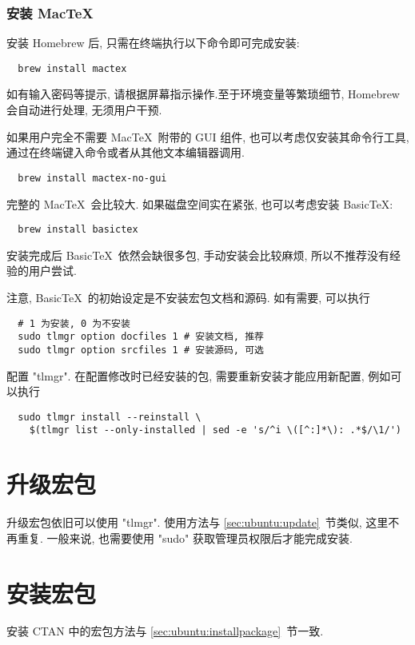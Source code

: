 \subsubsection{安装 Mac\TeX}

安装 Homebrew 后,
只需在\textsf{终端}执行以下命令即可完成安装:
\begin{lstlisting}
  brew install mactex
\end{lstlisting}
如有输入密码等提示, 请根据屏幕指示操作.至于环境变量等繁琐细节, Homebrew 会自动进行处理,
无须用户干预.

如果用户完全不需要 Mac\TeX\ 附带的 GUI 组件,
也可以考虑仅安装其命令行工具, 通过在终端键入命令或者从其他文本编辑器调用.
\begin{lstlisting}
  brew install mactex-no-gui
\end{lstlisting}

完整的 Mac\TeX\ 会比较大. 如果磁盘空间实在紧张, 也可以考虑安装 Basic\TeX:
\begin{lstlisting}
  brew install basictex
\end{lstlisting}
安装完成后 Basic\TeX\ 依然会缺很多包, 手动安装会比较麻烦, 所以不推荐没有经验的用户尝试.

注意, Basic\TeX\ 的初始设定是不安装宏包文档和源码. 如有需要, 可以执行
\begin{lstlisting}
  # 1 为安装, 0 为不安装
  sudo tlmgr option docfiles 1 # 安装文档, 推荐
  sudo tlmgr option srcfiles 1 # 安装源码, 可选
\end{lstlisting}
配置 "tlmgr". 在配置修改时已经安装的包, 需要重新安装才能应用新配置, 例如可以执行
\begin{lstlisting}
  sudo tlmgr install --reinstall \
    $(tlmgr list --only-installed | sed -e 's/^i \([^:]*\): .*$/\1/')
\end{lstlisting}

\section{升级宏包}

升级宏包依旧可以使用 "tlmgr".
使用方法与 \ref{sec:ubuntu:update}~节类似, 这里不再重复.
一般来说, 也需要使用 "sudo" 获取管理员权限后才能完成安装.

\section{安装宏包}

安装 CTAN 中的宏包方法与 \ref{sec:ubuntu:installpackage}~节一致.

